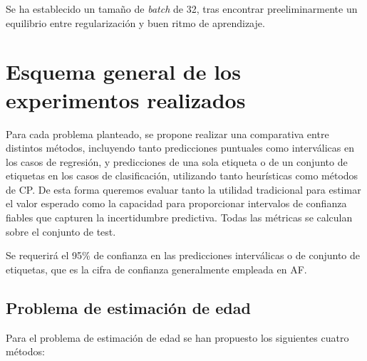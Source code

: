 Se ha establecido un tamaño de \textit{batch} de 32, tras encontrar preeliminarmente un equilibrio entre 
regularización y buen ritmo de aprendizaje.


\section{Esquema general de los experimentos realizados}

Para cada problema planteado, se propone realizar una comparativa entre distintos métodos, incluyendo tanto predicciones puntuales como interválicas en los casos de regresión, y predicciones de una sola etiqueta o de un conjunto de etiquetas en los casos de clasificación, utilizando tanto heurísticas como métodos de \acrshort{CP}.
De esta forma queremos evaluar tanto la utilidad tradicional para estimar el valor esperado como la capacidad para proporcionar intervalos de confianza fiables que capturen la incertidumbre predictiva. Todas las métricas se calculan sobre el conjunto de test. 

Se requerirá el 95\% de confianza en las predicciones interválicas o de conjunto de etiquetas, que es la cifra de confianza generalmente empleada en \acrshort{AF}. 

\subsection{Problema de estimación de edad}

Para el problema de estimación de edad se han propuesto los siguientes cuatro métodos:

